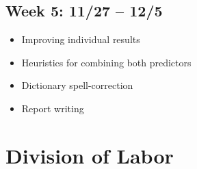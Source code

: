 \documentclass[12pt]{article}
\begin{document}
		\subsection*{Week 5: 11/27 -- 12/5}
			\begin{itemize}
				\item{Improving individual results}
				\item{Heuristics for combining both predictors}
				\item{Dictionary spell-correction}
				\item{Report writing}
			\end{itemize}

	\section{Division of Labor}
	
	

\end{document}
